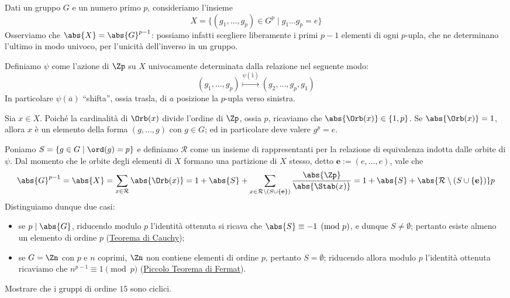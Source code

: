 \documentclass[11pt]{scrartcl}
\begin{document}
	Dati un gruppo $G$ e un numero primo $p$, consideriamo l'insieme 
	\[
	X = \{(g_1, \ldots, g_p) \in G^p\mid g_1\ldots g_p = e\}
	\]
	Osserviamo che $\abs{X} = \abs{G}^{p - 1}$: possiamo infatti scegliere liberamente
	i primi $p - 1$ elementi di ogni $p$-upla, che ne determinano l'ultimo in 
	modo univoco, per l'unicità dell'inverso in un gruppo. \medskip
	
	
	Definiamo $\psi$ come l'azione di $\Zp$ su $X$ univocamente determinata dalla relazione
	nel seguente modo:
	\[
	(g_1, \ldots, g_p) \overset{\psi(\overline{1})}{\mapsto} (g_2, \ldots, g_p, g_1)
	\]
	In particolare $\psi(\overline{a})$ ``shifta'', ossia trasla, di $a$ posizione
	la $p$-upla verso sinistra. \medskip
	
	Sia $x \in X$. Poiché la cardinalità di $\Orb(x)$ divide l'ordine di $\Zp$, ossia
	$p$, ricaviamo che $\abs{\Orb(x)} \in \{1, p\}$. Se $\abs{\Orb(x)} = 1$, allora
	$x$ è un elemento della forma $(g, \ldots, g)$ con $g \in G$; ed in particolare
	deve valere $g^p = e$. \medskip

	Poniamo $S = \{g\in G \mid \ord(g) = p\}$ e definiamo $\mathcal{R}$ come un insieme di 
	rappresentanti per la relazione di equivalenza indotta dalle orbite di $\psi$. Dal
	momento che
	le orbite degli elementi di $X$ formano una partizione di $X$ stesso, detto
	$\mathbf{e} := (e, \ldots, e)$, vale che
	\[
	\abs{G}^{p - 1} = \abs{X} = \sum_{x \in \mathcal{R}} \abs{\Orb(x)} = 1 + \abs{S} + \sum_{x \in \mathcal{R}\setminus (S \cup \{ \mathbf{e} \} )} \frac{\abs{\Zp}}{\abs{\Stab(x)}} = 1 + \abs{S} + \abs{\mathcal{R} \setminus (S \cup \{ \mathbf{e} \})} p
	\]
	Distinguiamo dunque due casi:
	\begin{itemize}
		\item se $p \mid \abs{G}$, riducendo modulo $p$ l'identità ottenuta si ricava che
		$\abs{S} \equiv -1 \pmod p$, e dunque $S \neq \emptyset$; pertanto
		esiste almeno un elemento di
		ordine $p$ (\hyperref[teorema1.44]{Teorema di Cauchy});
		\item se $G = \Zn$ con $p$ e $n$ coprimi, $\Zn$ non contiene elementi
		di ordine $p$, pertanto $S = \emptyset$; riducendo allora modulo $p$ l'identità ottenuta ricaviamo che
		$n^{p - 1} \equiv 1 \pmod p$ (\hyperref[teorema1.45]{Piccolo Teorema di Fermat}).
	\end{itemize}
	
	\begin{exercise}
		Mostrare che i gruppi di ordine $15$ sono ciclici.
	\end{exercise}
	
\end{document}
